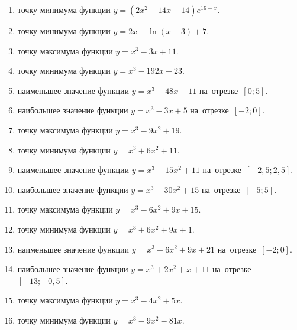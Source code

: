 \documentclass[a4paper,10pt]{article}
\begin{document}
\begin{enumerate}
\item {} точку минимума функции $y=\left(2x^2-14x+14\right){{e}^{16-x}}$.

\item {} точку минимума функции $y=2x-\ln \left(x+3\right)+7$.







\item {} точку максимума функции $y=x^3 -3x +11$.

\item {} точку минимума функции $y=x^3 -192x+23$.

\item {} наименьшее значение функции $y=x^3 -48x+11$ на~отрезке~$\left[0;5\right]$.

\item {} наибольшее значение функции $y=x^3 -3x+5$ на~отрезке~$\left[-2;0\right]$.

\item {} точку максимума функции $y=x^3 -9x^2+19$.

\item {} точку минимума функции $y=x^3 +6x^2+11$.

\item {} наименьшее значение функции $y=x^3 +15x^2+11$ на~отрезке~$\left[-2,5;2,5\right]$.

\item {} наибольшее значение функции $y=x^3 -30x^2+15$ на~отрезке~$\left[-5;5\right]$.

\item {} точку максимума функции $y=x^3 -6x^2+9x+15$.

\item {} точку минимума функции $y=x^3 +6x^2+9x+1$.

\item {} наименьшее значение функции $y=x^3 +6x^2+9x+21$ на~отрезке~$\left[-2;0\right]$.

\item {} наибольшее значение функции $y=x^3 +2x^2+x+11$ на~отрезке~$\left[-13;-0,5\right]$.

\item {} точку максимума функции $y=x^3 -4x^2+5x$.

\item {} точку минимума функции $y=x^3 -9x^2-81x$.


\end{enumerate}
\end{document}
